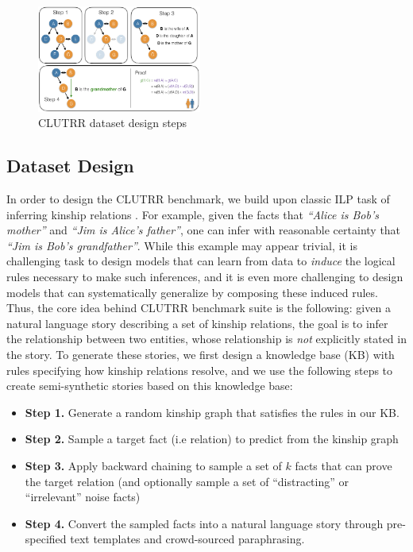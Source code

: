 \documentclass[12pt]{article}
\begin{document}
\begin{figure}
\begin{center}
  \includegraphics[width=0.48\textwidth]{images/clutrr_dataset_proof.png}
\end{center}
\caption{CLUTRR dataset design steps}
\label{fig:clutrr_data_design}
\end{figure}

\subsection{Dataset Design}

In order to design the CLUTRR benchmark, we build upon classic ILP task of inferring kinship relations \cite{hinton1986learning,muggleton1991inductive}. For example, given the facts that \textit{``Alice is Bob's mother''} and \textit{``Jim is Alice's father''}, one can infer with reasonable certainty that \textit{``Jim is Bob's grandfather''}. While this example may appear trivial, it is challenging task to design models that can learn from data to \textit{induce} the logical rules necessary to make such inferences, and it is even more challenging to design models that can systematically generalize by composing these induced rules. Thus, the core idea behind CLUTRR benchmark suite is the following: given a natural language story describing a set of kinship relations, the goal is to infer the relationship between two entities, whose relationship is \textit{not} explicitly stated in the story. To generate these stories, we first design a knowledge base (KB) with rules specifying how kinship relations resolve, and we use the following steps to create semi-synthetic stories based on this knowledge base:

\begin{itemize}
        \item \textbf{Step 1.} Generate a random kinship graph that satisfies the rules in our KB.
        \item \textbf{Step 2.} Sample a target fact (i.e relation) to predict from the kinship graph
        \item \textbf{Step 3.} Apply backward chaining to sample a set of $k$ facts that can prove the target relation (and optionally sample a set of ``distracting'' or ``irrelevant'' noise facts)
        \item \textbf{Step 4.} Convert the sampled facts into a natural language story through pre-specified text templates and crowd-sourced paraphrasing.
\end{itemize}
\end{document}
